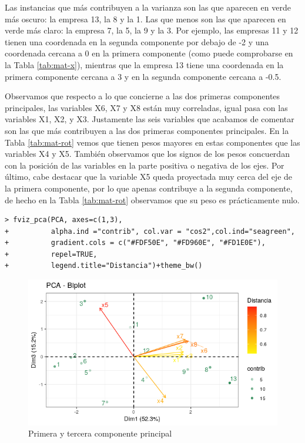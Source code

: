 \documentclass[12pt]{article}
\begin{document}
\pagebreak

Las instancias que más contribuyen a la varianza son las que aparecen
en verde más oscuro: la empresa 13, la 8 y la 1. Las que menos son las
que aparecen en verde más claro: la empresa 7, la 5, la 9 y la 3. Por
ejemplo, las empresas 11 y 12 tienen una coordenada en la segunda
componente por debajo de -2 y una coordenada cercana a 0 en la primera
componente (como puede comprobarse en la Tabla \ref{tab:mat-x}),
mientras que la empresa 13 tiene una coordenada en la primera
componente cercana a 3 y en la segunda componente cercana a -0.5.

Observamos que respecto a lo que concierne a las dos primeras
componentes principales, las variables X6, X7 y X8 están muy
correladas, igual pasa con las variables X1, X2, y X3. Justamente las
seis variables que acabamos de comentar son las que más contribuyen a
las dos primeras componentes principales. En la Tabla
\ref{tab:mat-rot} vemos que tienen pesos mayores en estas componentes
que las variables X4 y X5. También observamos que los signos de los
pesos concuerdan con la posición de las variables en la parte positiva
o negativa de los ejes. Por último, cabe destacar que la variable X5
queda proyectada muy cerca del eje de la primera componente, por lo
que apenas contribuye a la segunda componente, de hecho en la Tabla
\ref{tab:mat-rot} observamos que su peso es prácticamente nulo.

\begin{verbatim}
> fviz_pca(PCA, axes=c(1,3),
+          alpha.ind ="contrib", col.var = "cos2",col.ind="seagreen",
+          gradient.cols = c("#FDF50E", "#FD960E", "#FD1E0E"),
+          repel=TRUE,
+          legend.title="Distancia")+theme_bw()
\end{verbatim}

\begin{figure}[H]
  \centering
  \includegraphics[width=120mm]{imgs/biplot13}
  \caption{Primera y tercera componente principal}
  \label{fig:biplot13}
\end{figure}
\end{document}
